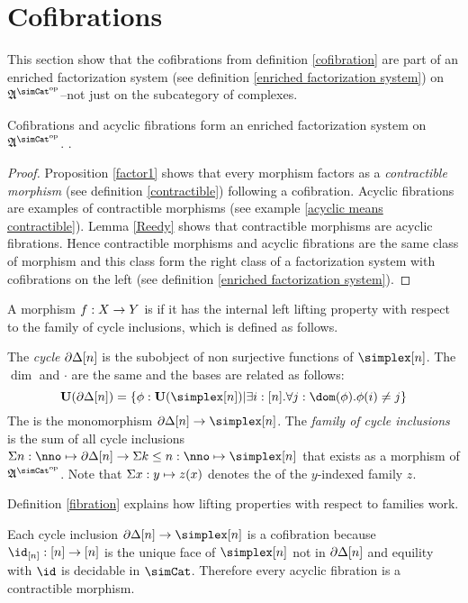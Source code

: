 \documentclass[csh.tex]{subfiles}
\begin{document}
\section{Cofibrations}
This section show that the cofibrations from definition \ref{cofibration} are part of an enriched factorization system (see definition \ref{enriched factorization system}) on $\ambient\s$--not just on the subcategory of complexes.

\begin{lemma} Cofibrations and acyclic fibrations form an enriched factorization system on $\ambient\s$. \label{factorization system 1}. \end{lemma}

\begin{proof} Proposition \ref{factor1} shows that every morphism factors as a \emph{contractible morphism} (see definition \ref{contractible}) following a cofibration. Acyclic fibrations are examples of contractible morphisms (see example \ref{acyclic means contractible}). Lemma \ref{Reedy} shows that contractible morphisms are acyclic fibrations. Hence contractible morphisms and acyclic fibrations are the same class of morphism and this class form the right class of a factorization system with cofibrations on the left (see definition \ref{enriched factorization system}).
\end{proof}

\begin{definition} A morphism $f: X\to Y$ is  if it has the internal left lifting property with respect to the family of cycle inclusions, which is defined as follows.

The \emph{cycle} $\partial\Delta[n]$ is the subobject of non surjective functions of $\simplex[n]$. The $\dim$ and $\cdot$ are the same and the bases are related as follows:
\[ \base(\cycle[n]) = \set{\phi\of\base(\simplex[n])| \exists i\of[n].\forall j\of \dom(\phi).\phi(i)\neq j } \]
The  is the monomorphism $\cycle[n]\to\simplex[n]$. The \emph{family of cycle inclusions} is the sum of all cycle inclusions $\coproduct{n\of\nno}{\cycle[n]}\to \coproduct{k\leq n\of\nno}{\simplex[n]}$ that exists as a morphism of $\ambient\s$. Note that $\Sigma x: y \mapsto z(x)$ denotes the  of the $y$-indexed family $z$.

Definition \ref{fibration} explains how lifting properties with respect to families work.
\end{definition}

\begin{example} Each cycle inclusion $\cycle[n]\to\simplex[n]$ is a cofibration because $\id_{[n]}\of[n]\to[n]$ is the unique face of $\simplex[n]$ not in $\partial\Delta[n]$ and equility with $\id$ is decidable in $\simCat$. Therefore every acyclic fibration is a contractible morphism. \label{acyclic means contractible}\end{example}
\end{document}
